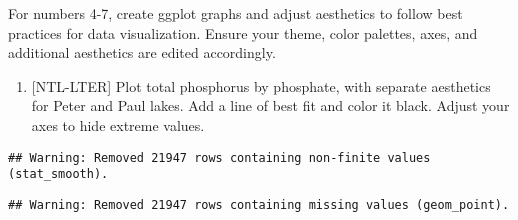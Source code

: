 \documentclass[]{article}
\newenvironment{Shaded}{\begin{snugshade}}{\end{snugshade}}
\newcommand{\DataTypeTok}[1]{\textcolor[rgb]{0.13,0.29,0.53}{#1}}
\newcommand{\DecValTok}[1]{\textcolor[rgb]{0.00,0.00,0.81}{#1}}
\newcommand{\KeywordTok}[1]{\textcolor[rgb]{0.13,0.29,0.53}{\textbf{#1}}}
\newcommand{\NormalTok}[1]{#1}
\newcommand{\OperatorTok}[1]{\textcolor[rgb]{0.81,0.36,0.00}{\textbf{#1}}}
\newcommand{\StringTok}[1]{\textcolor[rgb]{0.31,0.60,0.02}{#1}}
\providecommand{\tightlist}{%
  \setlength{\itemsep}{0pt}\setlength{\parskip}{0pt}}
\begin{document}
For numbers 4-7, create ggplot graphs and adjust aesthetics to follow
best practices for data visualization. Ensure your theme, color
palettes, axes, and additional aesthetics are edited accordingly.

\begin{enumerate}
\def\labelenumi{\arabic{enumi}.}
\setcounter{enumi}{3}
\tightlist
\item
  {[}NTL-LTER{]} Plot total phosphorus by phosphate, with separate
  aesthetics for Peter and Paul lakes. Add a line of best fit and color
  it black. Adjust your axes to hide extreme values.
\end{enumerate}

\begin{Shaded}
\end{Shaded}

\begin{verbatim}
## Warning: Removed 21947 rows containing non-finite values (stat_smooth).
\end{verbatim}

\begin{verbatim}
## Warning: Removed 21947 rows containing missing values (geom_point).
\end{verbatim}
\end{document}
